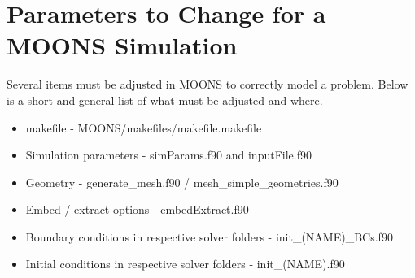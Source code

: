 \documentclass[11pt]{article}
\begin{document}
\doublespacing
\MOONSTITLE
\maketitle

\section{Parameters to Change for a MOONS Simulation}
Several items must be adjusted in MOONS to correctly model a problem. Below is a short and general list of what must be adjusted and where.

\begin{itemize}
\item makefile - MOONS/makefiles/makefile.makefile
\item Simulation parameters - simParams.f90 and inputFile.f90
\item Geometry - generate\_mesh.f90 / mesh\_simple\_geometries.f90
\item Embed / extract options - embedExtract.f90
\item Boundary conditions in respective solver folders - init\_(NAME)\_BCs.f90
\item Initial conditions in respective solver folders - init\_(NAME).f90
\end{itemize}
\end{document}
